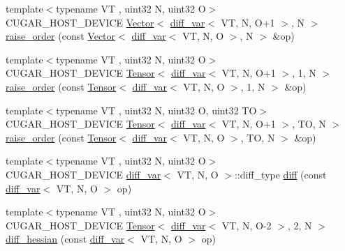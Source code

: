 \begin{DoxyCompactItemize}
\item 
{\footnotesize template$<$typename VT , uint32 N, uint32 O$>$ }\\C\+U\+G\+A\+R\+\_\+\+H\+O\+S\+T\+\_\+\+D\+E\+V\+I\+CE \hyperlink{structcugar_1_1_vector}{Vector}$<$ \hyperlink{structcugar_1_1diff__var}{diff\+\_\+var}$<$ VT, N, O+1 $>$, N $>$ \hyperlink{group___auto_diff_module_ga5ffca09f2068cbef476ec0b01471b048}{raise\+\_\+order} (const \hyperlink{structcugar_1_1_vector}{Vector}$<$ \hyperlink{structcugar_1_1diff__var}{diff\+\_\+var}$<$ VT, N, O $>$, N $>$ \&op)
\item 
{\footnotesize template$<$typename VT , uint32 N, uint32 O$>$ }\\C\+U\+G\+A\+R\+\_\+\+H\+O\+S\+T\+\_\+\+D\+E\+V\+I\+CE \hyperlink{structcugar_1_1_tensor}{Tensor}$<$ \hyperlink{structcugar_1_1diff__var}{diff\+\_\+var}$<$ VT, N, O+1 $>$, 1, N $>$ \hyperlink{group___auto_diff_module_ga927a53d59463095a4233941b69143e3d}{raise\+\_\+order} (const \hyperlink{structcugar_1_1_tensor}{Tensor}$<$ \hyperlink{structcugar_1_1diff__var}{diff\+\_\+var}$<$ VT, N, O $>$, 1, N $>$ \&op)
\item 
{\footnotesize template$<$typename VT , uint32 N, uint32 O, uint32 TO$>$ }\\C\+U\+G\+A\+R\+\_\+\+H\+O\+S\+T\+\_\+\+D\+E\+V\+I\+CE \hyperlink{structcugar_1_1_tensor}{Tensor}$<$ \hyperlink{structcugar_1_1diff__var}{diff\+\_\+var}$<$ VT, N, O+1 $>$, TO, N $>$ \hyperlink{group___auto_diff_module_ga82f8f2fd2da48a18577ce68213e366a3}{raise\+\_\+order} (const \hyperlink{structcugar_1_1_tensor}{Tensor}$<$ \hyperlink{structcugar_1_1diff__var}{diff\+\_\+var}$<$ VT, N, O $>$, TO, N $>$ \&op)
\item 
{\footnotesize template$<$typename VT , uint32 N, uint32 O$>$ }\\C\+U\+G\+A\+R\+\_\+\+H\+O\+S\+T\+\_\+\+D\+E\+V\+I\+CE \hyperlink{structcugar_1_1diff__var}{diff\+\_\+var}$<$ VT, N, O $>$\+::diff\+\_\+type \hyperlink{group___auto_diff_module_ga4d07150db2aa5b201c75e376b5580eba}{diff} (const \hyperlink{structcugar_1_1diff__var}{diff\+\_\+var}$<$ VT, N, O $>$ op)
\item 
{\footnotesize template$<$typename VT , uint32 N, uint32 O$>$ }\\C\+U\+G\+A\+R\+\_\+\+H\+O\+S\+T\+\_\+\+D\+E\+V\+I\+CE \hyperlink{structcugar_1_1_tensor}{Tensor}$<$ \hyperlink{structcugar_1_1diff__var}{diff\+\_\+var}$<$ VT, N, O-\/2 $>$, 2, N $>$ \hyperlink{group___auto_diff_module_ga518dc6dc852ca96522bcbb651298a625}{diff\+\_\+hessian} (const \hyperlink{structcugar_1_1diff__var}{diff\+\_\+var}$<$ VT, N, O $>$ op)

\end{DoxyCompactItemize}
